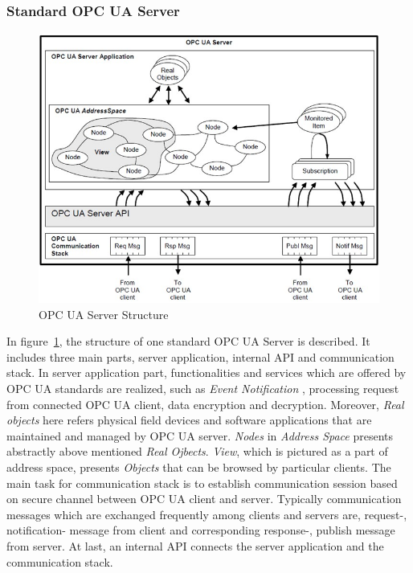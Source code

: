 \documentclass[]{llncs}
\begin{document}
\subsubsection{Standard OPC UA Server}
\begin{figure}[!htbp]
	\centering
	\includegraphics[width=1\textwidth]{server.jpg}
		\caption[ ]{OPC UA Server Structure\cite{O1}}
	\label{fig:server}
\end{figure}
In figure~\ref{fig:server}, the structure of one standard OPC UA Server is described. It includes three main parts, server application, internal API and communication stack. In server application part,  functionalities and services which are offered by OPC UA standards are realized, such as \emph{Event Notification} , processing request from connected OPC UA client, data encryption and decryption. Moreover, \emph{Real objects}  here  refers physical field devices and software applications that are maintained and managed by OPC UA server. \emph{Nodes} in \emph{Address Space} presents  abstractly above mentioned \emph{Real Ojbects}. \emph{View}, which is pictured as a part of address space, presents \emph{Objects} that can be browsed by particular clients. The main  task for communication stack  is to establish communication session based on secure channel between OPC UA client and server. Typically communication messages which are exchanged frequently among clients and servers are, request-, notification- message from client and   corresponding   response-, publish message from server. At last, an internal API connects the server application and the communication stack.
\end{document}
